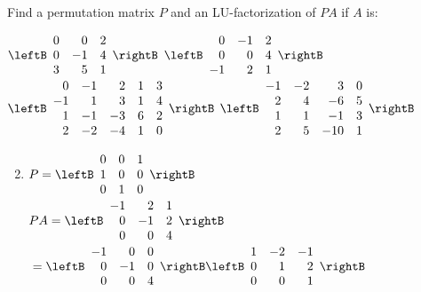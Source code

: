 \begin{multicols}{2}
\begin{ex}
\begin{sol}
\begin{enumerate}[label={\alph*.}]
\end{enumerate}
\end{sol}
\end{ex}


\begin{ex}
Find a permutation matrix $P$ and an LU-factorization of $PA$ if $A$ is:
\begin{exenumerate}
\exitem $\leftB \begin{array}{rrr}
0 & 0 & 2 \\
0 & -1 & 4 \\
3 & 5 & 1
\end{array} \rightB$
\exitem $\leftB \begin{array}{rrr}
0 & -1 & 2 \\
0 & 0 & 4 \\
-1 & 2 & 1
\end{array} \rightB$
\exitem* $\leftB \begin{array}{rrrrr}
0 & -1 & 2 & 1 & 3\\
-1 & 1 & 3 & 1 & 4 \\
1 & -1 & -3 & 6 & 2 \\
2 & -2 & -4 & 1 & 0
\end{array} \rightB$
\exitem* $\leftB \begin{array}{rrrr}
-1 & -2 & 3 & 0 \\
2 & 4 & -6 & 5 \\
1 & 1 & -1 & 3 \\
2 & 5 & -10 & 1
\end{array} \rightB$
\end{exenumerate}
\begin{sol} 
\begin{enumerate}[label={\alph*.}]
\setcounter{enumi}{1}
\item $P = \leftB \begin{array}{rrr}
0 & 0 & 1 \\
1 & 0 & 0 \\
0 & 1 & 0
\end{array} \rightB$ \\ $PA = \leftB \begin{array}{rrr}
-1 & 2 & 1 \\
0 & -1 & 2 \\
0 & 0 & 4
\end{array} \rightB$ \\ ${} = \leftB \begin{array}{rrr}
-1 & 0 & 0 \\
0 & -1 & 0 \\
0 & 0 & 4
\end{array} \rightB \leftB \begin{array}{rrr}
1 & -2 & -1 \\
0 & 1 & 2 \\
0 & 0 & 1
\end{array} \rightB$


\end{enumerate}
\end{sol}
\end{ex}
\end{multicols}
